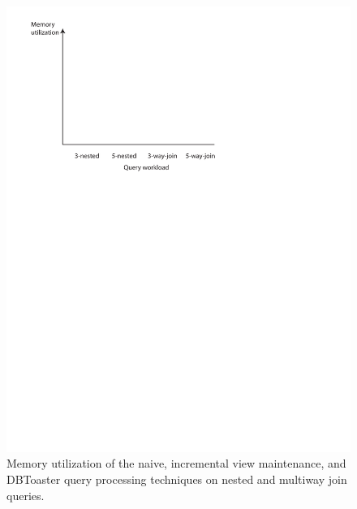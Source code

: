 {\begin{figure}
\includegraphics[scale=0.6]{figures/axes-memnjquery.pdf}
\caption{Memory utilization of the naive, incremental view maintenance, and
  DBToaster query processing techniques on nested and multiway join queries.}
\label{fig:memutil-njquery}
\end{figure}

}

